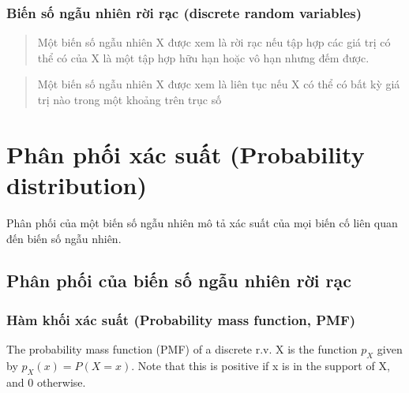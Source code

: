 \documentclass[
]{book}
\begin{document}
\hypertarget{biux1ebfn-sux1ed1-ngux1eabu-nhiuxean-rux1eddi-rux1ea1c-discrete-random-variables}{%
\subsubsection{Biến số ngẫu nhiên rời rạc (discrete random variables)}\label{biux1ebfn-sux1ed1-ngux1eabu-nhiuxean-rux1eddi-rux1ea1c-discrete-random-variables}}

\begin{quote}
Một biến số ngẫu nhiên X được xem là rời rạc nếu tập hợp các giá trị có thể có của X là một tập hợp hữu hạn hoặc vô hạn nhưng đếm được.
\end{quote}

\begin{quote}
Một biến số ngẫu nhiên X được xem là liên tục nếu X có thể có bất kỳ giá trị nào trong một khoảng trên trục số
\end{quote}

\hypertarget{phuxe2n-phux1ed1i-xuxe1c-suux1ea5t-probability-distribution}{%
\section{Phân phối xác suất (Probability distribution)}\label{phuxe2n-phux1ed1i-xuxe1c-suux1ea5t-probability-distribution}}

Phân phối của một biến số ngẫu nhiên mô tả xác suất của mọi biến cố liên quan đến biến số ngẫu nhiên.

\hypertarget{phuxe2n-phux1ed1i-cux1ee7a-biux1ebfn-sux1ed1-ngux1eabu-nhiuxean-rux1eddi-rux1ea1c}{%
\subsection{Phân phối của biến số ngẫu nhiên rời rạc}\label{phuxe2n-phux1ed1i-cux1ee7a-biux1ebfn-sux1ed1-ngux1eabu-nhiuxean-rux1eddi-rux1ea1c}}

\hypertarget{huxe0m-khux1ed1i-xuxe1c-suux1ea5t-probability-mass-function-pmf}{%
\subsubsection{Hàm khối xác suất (Probability mass function, PMF)}\label{huxe0m-khux1ed1i-xuxe1c-suux1ea5t-probability-mass-function-pmf}}

The probability mass function (PMF) of a discrete r.v. X is the function \(p_X\) given by \(p_X(x) = P(X = x)\). Note that this is positive if x is in the support of X, and 0 otherwise.
\end{document}
